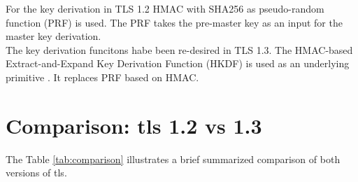For the key derivation in TLS 1.2 HMAC with SHA256 as pseudo-random function (PRF) is used. The PRF takes the pre-master key as an input for the master key derivation. \\
The key derivation funcitons habe been re-desired in TLS 1.3. The HMAC-based Extract-and-Expand Key Derivation Function (HKDF) is used as an underlying primitive \cite{Hassenstein}. It replaces PRF based on HMAC.


\section{Comparison: \gls{tls} 1.2 vs 1.3}
\label{sec:comparison}

The Table \ref{tab:comparison} illustrates a brief summarized comparison of both versions of \gls{tls}.

